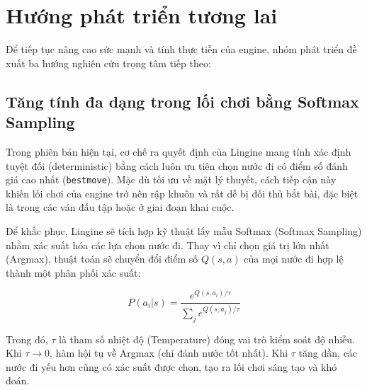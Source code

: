 \section{Hướng phát triển tương lai}

Để tiếp tục nâng cao sức mạnh và tính thực tiễn của engine, nhóm phát triển đề xuất ba hướng nghiên cứu trọng tâm tiếp theo:

\subsection{Tăng tính đa dạng trong lối chơi bằng Softmax Sampling}

Trong phiên bản hiện tại, cơ chế ra quyết định của Lingine mang tính xác định tuyệt đối (deterministic) bằng cách luôn ưu tiên chọn nước đi có điểm số đánh giá cao nhất (\texttt{bestmove}). Mặc dù tối ưu về mặt lý thuyết, cách tiếp cận này khiến lối chơi của engine trở nên rập khuôn và rất dễ bị đối thủ bắt bài, đặc biệt là trong các ván đấu tập hoặc ở giai đoạn khai cuộc.

Để khắc phục, Lingine sẽ tích hợp kỹ thuật lấy mẫu Softmax (Softmax Sampling) nhằm xác suất hóa các lựa chọn nước đi. Thay vì chỉ chọn giá trị lớn nhất (Argmax), thuật toán sẽ chuyển đổi điểm số $Q(s, a)$ của mọi nước đi hợp lệ thành một phân phối xác suất:

\begin{equation}
P(a_i | s) = \frac{e^{Q(s, a_i) / \tau}}{\sum_j e^{Q(s, a_j) / \tau}}
\end{equation}

Trong đó, $\tau$ là tham số nhiệt độ (Temperature) đóng vai trò kiểm soát độ nhiễu. Khi $\tau \to 0$, hàm hội tụ về Argmax (chỉ đánh nước tốt nhất). Khi $\tau$ tăng dần, các nước đi yếu hơn cũng có xác suất được chọn, tạo ra lối chơi sáng tạo và khó đoán.

